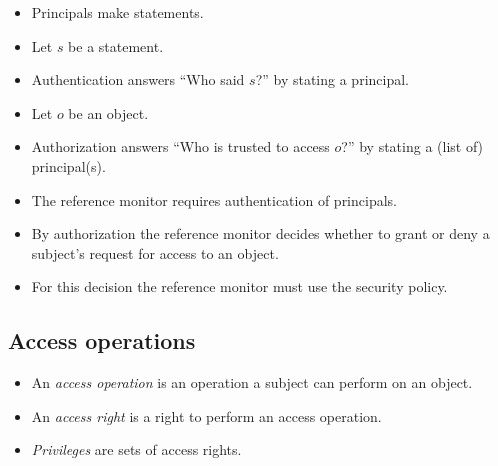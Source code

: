 \begin{frame}
  \begin{definition}[Authentication]
    \begin{itemize}
      \item Principals make statements.

      \item Let \(s\) be a statement.

      \item Authentication answers \enquote{Who said \(s\)?} by stating 
        a principal.
    \end{itemize}
  \end{definition}

  \pause

  \begin{definition}[Authorization]
    \begin{itemize}
      \item Let \(o\) be an object.

      \item Authorization answers \enquote{Who is trusted to access \(o\)?} by 
        stating a (list of) principal(s).
    \end{itemize}
  \end{definition}
\end{frame}

\begin{frame}
  \begin{idea}
    \begin{itemize}
      \item The reference monitor requires authentication of principals.

      \item By authorization the reference monitor decides whether to grant or 
        deny a subject's request for access to an object.

      \item For this decision the reference monitor must use the security policy.
    \end{itemize}
  \end{idea}
\end{frame}


\subsection{Access operations}

\begin{frame}
  \begin{definition}
    \begin{itemize}
      \item An \emph{access operation} is an operation a subject can perform on 
        an object.

      \item An \emph{access right} is a right to perform an access operation.

      \item \emph{Privileges} are sets of access rights.
    \end{itemize}
  \end{definition}
\end{frame}

